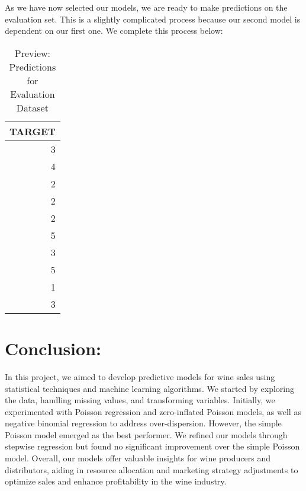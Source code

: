 \documentclass[
]{article}
\begin{document}
As we have now selected our models, we are ready to make predictions on
the evaluation set. This is a slightly complicated process because our
second model is dependent on our first one. We complete this process
below:

\begin{table}[H]
\centering\centering
\caption{\label{tab:unnamed-chunk-33}Preview: Predictions for Evaluation Dataset}
\centering
\begin{tabular}[t]{r}
\hline
TARGET\\
\hline
3\\
\hline
4\\
\hline
2\\
\hline
2\\
\hline
2\\
\hline
5\\
\hline
3\\
\hline
5\\
\hline
1\\
\hline
3\\
\hline
\end{tabular}
\end{table}

\section{Conclusion:}\label{conclusion}

In this project, we aimed to develop predictive models for wine sales
using statistical techniques and machine learning algorithms. We started
by exploring the data, handling missing values, and transforming
variables. Initially, we experimented with Poisson regression and
zero-inflated Poisson models, as well as negative binomial regression to
address over-dispersion. However, the simple Poisson model emerged as
the best performer. We refined our models through stepwise regression
but found no significant improvement over the simple Poisson model.
Overall, our models offer valuable insights for wine producers and
distributors, aiding in resource allocation and marketing strategy
adjustments to optimize sales and enhance profitability in the wine
industry.
\end{document}
